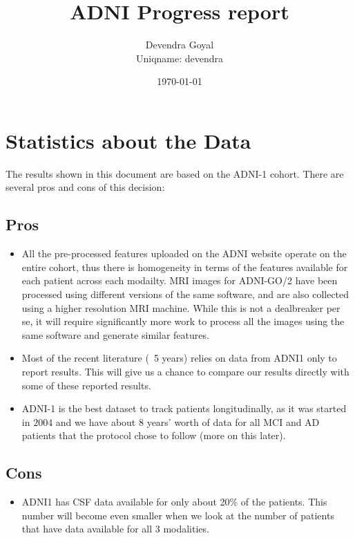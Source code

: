 \documentclass[12pt,a4paper]{article}
\title{ADNI Progress report}
\author{Devendra Goyal\\Uniqname: devendra}
\date{\today}
\begin{document}
\maketitle

\section{Statistics about the Data}
\label{sec:stats}

The results shown in this document are based on the ADNI-1
cohort. There are several pros and cons of this decision:

\subsection{Pros}

\begin{itemize}
\item All the pre-processed features uploaded on the ADNI website
  operate on the entire cohort, thus there is homogeneity in terms of
  the features available for each patient across each modailty. MRI
  images for ADNI-GO/2 have been processed using different versions of
  the same software, and are also collected using a higher resolution
  MRI machine. While this is not a dealbreaker per se, it will require
  significantly more work to process all the images using the same
  software and generate similar features.
\item Most of the recent literature (~5 years) relies on data from ADNI1
  only to report results. This will give us a chance to compare our
  results directly with some of these reported results.
\item ADNI-1 is the best dataset to track patients longitudinally, as
  it was started in $2004$ and we have about $8$ years' worth of data
  for all MCI and AD patients that the protocol chose to follow (more
  on this later). 
\end{itemize}

\subsection{Cons}

\begin{itemize}
\item ADNI1 has CSF data available for only about 20\% of the
  patients. This number will become even smaller when we look at the
  number of patients that have data available for all 3 modalities.
\end{itemize}
\end{document}
